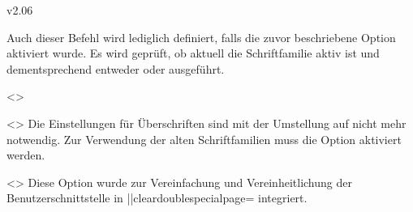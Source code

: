 \begin{Entity}{}
\begin{Changes}{v2.06}
\begin{Obsolete}
  {}
\printdeclarationlist
%
Auch dieser Befehl wird lediglich definiert, falls die zuvor beschriebene 
Option  aktiviert wurde. Es wird geprüft, ob aktuell die 
Schriftfamilie \DIN aktiv ist und dementsprechend entweder  
oder  ausgeführt. 
\end{Obsolete}

\begin{Obsolete}
  {}
  <>
\begin{Obsolete}
  {}
  <>
\printdeclarationlist
%
Die Einstellungen für Überschriften sind mit der Umstellung auf \OpenSans nicht 
mehr notwendig. Zur Verwendung der alten Schriftfamilien muss die Option 
 aktiviert werden.
\end{Obsolete}
\end{Obsolete}

\begin{Obsolete}
  {}
  <>
\printdeclarationlist
%
Diese Option wurde zur Vereinfachung und Vereinheitlichung der 
Benutzerschnittstelle in \Option||{cleardoublespecialpage=\PMisc} integriert.
\end{Obsolete}


\end{Changes}
\end{Entity}
